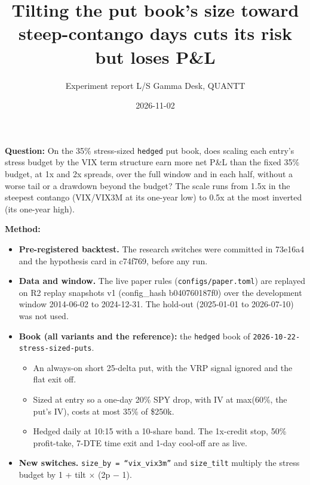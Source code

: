 \documentclass{article}
\title{Tilting the put book's size toward steep-contango days cuts its risk but loses P\&L}
\author{Experiment report \textperiodcentered{} L/S Gamma Desk, QUANTT}
\date{2026-11-02}
\begin{document}
\maketitle

\textbf{Question:} On the 35\% stress-sized \texttt{hedged} put book, does scaling each entry's stress budget by the VIX term structure earn more net P\&L than the fixed 35\% budget, at 1x and 2x spreads, over the full window and in each half, without a worse tail or a drawdown beyond the budget? The scale runs from 1.5x in the steepest contango (VIX/\allowbreak{}VIX3M at its one-year low) to 0.5x at the most inverted (its one-year high).

\textbf{Method:}

\begin{itemize}

\item \textbf{Pre-registered backtest.} The research switches were committed in 73e16a4 and the hypothesis card in c74f769, before any run.

\item \textbf{Data and window.} The live paper rules (\texttt{configs/\allowbreak{}paper.\allowbreak{}toml}) are replayed on R2 replay snapshots v1 (config\_hash b040760187f0) over the development window 2014-06-02 to 2024-12-31. The hold-out (2025-01-01 to 2026-07-10) was not used.

\item \textbf{Book (all variants and the reference):} the \texttt{hedged} book of \texttt{2026-\allowbreak{}10-\allowbreak{}22-\allowbreak{}stress-\allowbreak{}sized-\allowbreak{}puts}.

\begin{itemize}

\item An always-on short 25-delta put, with the VRP signal ignored and the flat exit off.

\item Sized at entry so a one-day 20\% SPY drop, with IV at max(60\%, the put's IV), costs at most 35\% of \$250k.

\item Hedged daily at 10:15 with a 10-share band. The 1x-credit stop, 50\% profit-take, 7-DTE time exit and 1-day cool-off are as live.

\end{itemize}

\item \textbf{New switches.} \texttt{size\_\allowbreak{}by = ``vix\_\allowbreak{}vix3m''} and \texttt{size\_\allowbreak{}tilt} multiply the stress budget by 1 + tilt \ensuremath{\times} (2p \ensuremath{-} 1).


\end{itemize}
\end{document}
